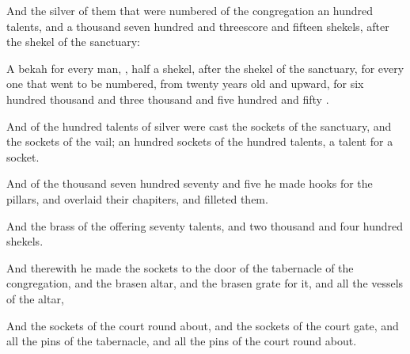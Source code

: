 {And the
silver of them that were
numbered of the
congregation
{} an
hundred
talents, and a
thousand
seven
hundred and threescore and
fifteen
shekels, after the
shekel of the
sanctuary:

A
bekah for every
man,
{},
half a
shekel, after the
shekel of the
sanctuary, for every one that
went to be
numbered, from
twenty
years
old and
upward, for
six
hundred
thousand and
three
thousand and
five
hundred and
fifty
{}.

And of the
hundred
talents of
silver were
cast the
sockets of the
sanctuary, and the
sockets of the
vail; an
hundred
sockets of the
hundred
talents, a
talent for a
socket.

And of the
thousand
seven
hundred
seventy and
five
{} he
made
hooks for the
pillars, and
overlaid their
chapiters, and
filleted them.

And the
brass of the
offering
{}
seventy
talents, and two
thousand and
four
hundred
shekels.

And therewith he
made the
sockets to the
door of the
tabernacle of the
congregation, and the
brasen
altar, and the
brasen
grate for it, and all the
vessels of the
altar,

And the
sockets of the
court round
about, and the
sockets of the
court
gate, and all the
pins of the
tabernacle, and all the
pins of the
court round
about.




\par }
